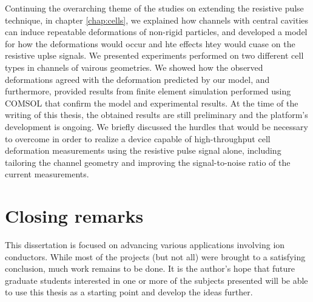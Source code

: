		Continuing the overarching theme of the studies on extending the resistive pulse technique, in chapter \ref{chap:cells}, we explained how channels with central cavities can induce repeatable deformations of non-rigid particles, and developed a model for how the deformations would occur and hte effects htey would cuase on the resistive uplse signals. We presented experiments performed on two different cell types in channels of vairous geometries. We showed how the observed deformations agreed with the deformation predicted by our model, and furthermore, provided results from finite element simulation performed using COMSOL that confirm the model and experimental results. At the time of the writing of this thesis, the obtained results are still preliminary and the platform's development is ongoing. We briefly discussed the hurdles that would be necessary to overcome in order to realize a device capable of high-throughput cell deformation measurements using the resistive pulse signal alone, including tailoring the channel geometry and improving the signal-to-noise ratio of the current measurements.
		
		
\section{Closing remarks}
      
	This dissertation is focused on advancing various applications involving ion conductors. While most of the projects (but not all) were brought to a satisfying conclusion, much work remains to be done. It is the author's hope that future graduate students interested in one or more of the subjects presented will be able to use this thesis as a starting point and develop the ideas further.
	
		




			
			
			

			
			
			
			

			
			


			
	





